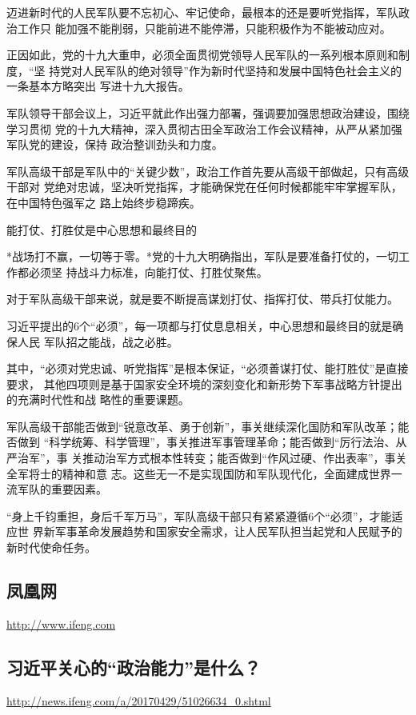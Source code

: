 \documentclass[11pt]{ctexart}
\begin{document}
{{{{迈进新时代的人民军队要不忘初心、牢记使命，最根本的还是要听党指挥，军队政治工作只
能加强不能削弱，只能前进不能停滞，只能积极作为不能被动应对。

正因如此，党的十九大重申，必须全面贯彻党领导人民军队的一系列根本原则和制度，“坚
持党对人民军队的绝对领导”作为新时代坚持和发展中国特色社会主义的一条基本方略突出
写进十九大报告。

军队领导干部会议上，习近平就此作出强力部署，强调要加强思想政治建设，围绕学习贯彻
党的十九大精神，深入贯彻古田全军政治工作会议精神，从严从紧加强军队党的建设，保持
政治整训劲头和力度。

军队高级干部是军队中的“关键少数”，政治工作首先要从高级干部做起，只有高级干部对
党绝对忠诚，坚决听党指挥，才能确保党在任何时候都能牢牢掌握军队，在中国特色强军之
路上始终步稳蹄疾。

能打仗、打胜仗是中心思想和最终目的

*战场打不赢，一切等于零。*党的十九大明确指出，军队是要准备打仗的，一切工作都必须坚
持战斗力标准，向能打仗、打胜仗聚焦。

对于军队高级干部来说，就是要不断提高谋划打仗、指挥打仗、带兵打仗能力。

习近平提出的6个“必须”，每一项都与打仗息息相关，中心思想和最终目的就是确保人民
军队招之能战，战之必胜。

其中，“必须对党忠诚、听党指挥”是根本保证，“必须善谋打仗、能打胜仗”是直接要求，
其他四项则是基于国家安全环境的深刻变化和新形势下军事战略方针提出的充满时代性和战
略性的重要课题。

军队高级干部能否做到“锐意改革、勇于创新”，事关继续深化国防和军队改革；能否做到
“科学统筹、科学管理”，事关推进军事管理革命；能否做到“厉行法治、从严治军”，事
关推动治军方式根本性转变；能否做到“作风过硬、作出表率”，事关全军将士的精神和意
志。这些无一不是实现国防和军队现代化，全面建成世界一流军队的重要因素。

“身上千钧重担，身后千军万马”，军队高级干部只有紧紧遵循6个“必须”，才能适应世
界新军事革命发展趋势和国家安全需求，让人民军队担当起党和人民赋予的新时代使命任务。

\subsection{凤凰网}
\label{sec:org10cfa56}
\url{http://www.ifeng.com}
\subsection{习近平关心的“政治能力”是什么？}
\label{sec:org1f1e8e2}
\url{http://news.ifeng.com/a/20170429/51026634\_0.shtml}
}}}}
\end{document}
